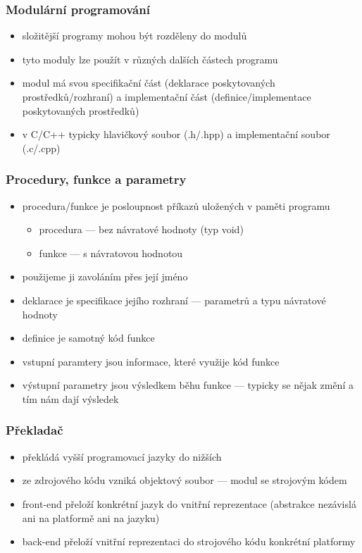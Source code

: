 \subsubsection*{Modulární programování}
\begin{itemize}
	\item složitější programy mohou být rozděleny do modulů
	\item tyto moduly lze použít v různých dalších částech programu
	\item modul má svou specifikační část (deklarace poskytovaných prostředků/rozhraní) a implementační část (definice/implementace poskytovaných prostředků)
	\item v C/C++ typicky hlavičkový soubor (.h/.hpp) a implementační soubor (.c/.cpp)
\end{itemize}

\subsubsection*{Procedury, funkce a parametry}
\begin{itemize}
	\item procedura/funkce je posloupnost příkazů uložených v paměti programu
	\begin{itemize}
		\item procedura --- bez návratové hodnoty (typ void)
		\item funkce --- s návratovou hodnotou
	\end{itemize}
	\item použijeme ji zavoláním přes její jméno 
	\item deklarace je specifikace jejího rozhraní --- parametrů a typu návratové hodnoty
	\item definice je samotný kód funkce
	\item vstupní paramtery jsou informace, které využije kód funkce
	\item výstupní parametry jsou výsledkem běhu funkce --- typicky se nějak změní a tím nám dají výsledek
\end{itemize}

\subsubsection*{Překladač}
\begin{itemize}
	\item překládá vyšší programovací jazyky do nižších
	\item ze zdrojového kódu vzniká objektový soubor --- modul se strojovým kódem
	\item front-end přeloží konkrétní jazyk do vnitřní reprezentace (abstrakce nezávislá ani na platformě ani na jazyku)
	\item back-end přeloží vnitřní reprezentaci do strojového kódu konkrétní platformy
\end{itemize}

